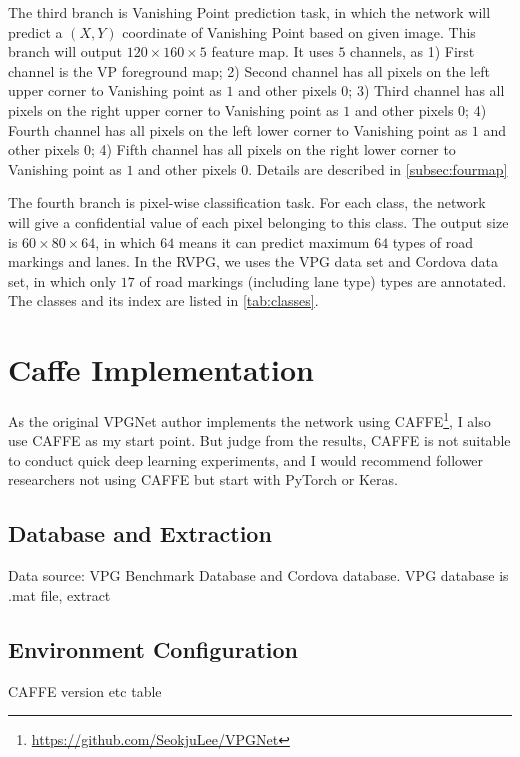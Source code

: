 \begin{spacing}{1.5}
The third branch is Vanishing Point prediction task, in which the network will predict a $(X,Y)$ coordinate of Vanishing Point based on given image. This branch will output $120 \times 160 \times 5$ feature map. It uses $5$ channels, as 1) First channel is the VP foreground map; 2) Second channel has all pixels on the left upper corner to Vanishing point as $1$ and other pixels $0$; 3) Third channel has all pixels on the right upper corner to Vanishing point as $1$ and other pixels $0$; 4) Fourth channel has all pixels on the left lower corner to Vanishing point as $1$ and other pixels $0$; 4) Fifth channel has all pixels on the right lower corner to Vanishing point as $1$ and other pixels $0$. Details are described in \autoref{subsec:fourmap}

The fourth branch is pixel-wise classification task. For each class, the network will give a confidential value of each pixel belonging to this class. The output size is $60 \times 80 \times 64$, in which $64$ means it can predict maximum $64$ types of road markings and lanes. In the RVPG, we uses the VPG data set and Cordova data set, in which only $17$ of road markings (including lane type) types are annotated. The classes and its index are listed in \autoref{tab:classes}.

\section{Caffe Implementation}
\label{sec:MD_CAFFE}

As the original VPGNet author implements the network using CAFFE\footnote{\url{https://github.com/SeokjuLee/VPGNet}}, I also use CAFFE as my start point. But judge from the results, CAFFE is not suitable to conduct quick deep learning experiments, and I would recommend follower researchers not using CAFFE but start with PyTorch or Keras. 


\subsection{Database and Extraction}

Data source: VPG Benchmark Database and Cordova database.
VPG database is .mat file, extract

\subsection{Environment Configuration}

CAFFE version etc table


\end{spacing}
